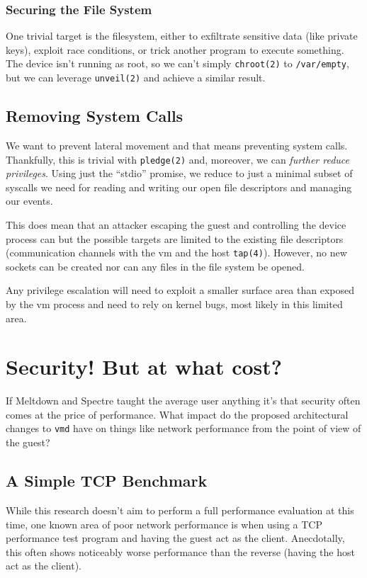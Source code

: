 \documentclass[conference]{IEEEtran}
\begin{document}
\vspace{2mm}
\subsubsection{Securing the File System}
One trivial target is the filesystem, either to exfiltrate sensitive
data (like private keys), exploit race conditions, or trick another
program to execute something. The device isn't running as root, so we
can't simply \texttt{chroot(2)} to \texttt{/var/empty}, but we can
leverage \texttt{unveil(2)} and achieve a similar result.

\vspace{2mm}
\subsection{Removing System Calls}
We want to prevent lateral movement and that means preventing system
calls. Thankfully, this is trivial with \texttt{pledge(2)} and,
moreover, we can \emph{further reduce privileges}. Using just the
``stdio'' promise, we reduce to just a minimal subset of syscalls we
need for reading and writing our open file descriptors and managing
our events.

This does mean that an attacker escaping the guest and controlling the
device process can  but the possible targets
are limited to the existing file descriptors (communication channels
with the vm and the host \texttt{tap(4)}). However, no new sockets can
be created nor can any files in the file system be opened.

Any privilege escalation will need to exploit a smaller surface area
than exposed by the vm process and need to rely on kernel bugs, most
likely in this limited area.


\vspace{5mm}
\section{Security! But at what cost?}
If Meltdown and Spectre taught the average user anything it's that
security often comes at the price of performance. What impact do the
proposed architectural changes to \texttt{vmd} have on things like
network performance from the point of view of the guest?

\vspace{3mm}
\subsection{A Simple TCP Benchmark}
While this research doesn't aim to perform a full performance
evaluation at this time, one known area of poor network performance is
when using a TCP performance test program and having the guest act as
the client. Anecdotally, this often shows noticeably worse performance
than the reverse (having the host act as the client).
\end{document}
